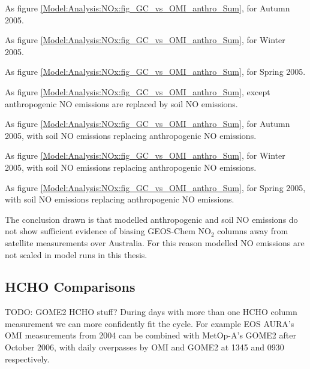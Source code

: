       {As figure \ref{Model:Analysis:NOx:fig_GC_vs_OMI_anthro_Sum}, for Autumn 2005.}
      {\label{Model:Analysis:NOx:fig_GC_vs_OMI_anthro_Aut}}
      
      {As figure \ref{Model:Analysis:NOx:fig_GC_vs_OMI_anthro_Sum}, for Winter 2005.}
      {\label{Model:Analysis:NOx:fig_GC_vs_OMI_anthro_Win}}
    
      {As figure \ref{Model:Analysis:NOx:fig_GC_vs_OMI_anthro_Sum}, for Spring 2005.}
      {\label{Model:Analysis:NOx:fig_GC_vs_OMI_anthro_Spr}}
    
      {As figure \ref{Model:Analysis:NOx:fig_GC_vs_OMI_anthro_Sum}, except anthropogenic NO emissions are replaced by soil NO emissions.}
      {\label{Model:Analysis:NOx:fig_GC_vs_OMI_soil_Sum}}
    
      {As figure \ref{Model:Analysis:NOx:fig_GC_vs_OMI_anthro_Sum}, for Autumn 2005, with soil NO emissions replacing anthropogenic NO emissions.}
      {\label{Model:Analysis:NOx:fig_GC_vs_OMI_soil_Aut}}
      
      {As figure \ref{Model:Analysis:NOx:fig_GC_vs_OMI_anthro_Sum}, for Winter 2005, with soil NO emissions replacing anthropogenic NO emissions.}
      {\label{Model:Analysis:NOx:fig_GC_vs_OMI_soil_Win}}
      
      {As figure \ref{Model:Analysis:NOx:fig_GC_vs_OMI_anthro_Sum}, for Spring 2005, with soil NO emissions replacing anthropogenic NO emissions.}
      {\label{Model:Analysis:NOx:fig_GC_vs_OMI_soil_Spr}}
    
    The conclusion drawn is that modelled anthropogenic and soil NO emissions do not show sufficient evidence of biasing GEOS-Chem NO$_2$ columns away from satellite measurements over Australia.
    For this reason modelled NO emissions are not scaled in model runs in this thesis.
    
  \subsection{HCHO Comparisons}
    TODO: GOME2 HCHO stuff?
    During days with more than one HCHO column measurement we can more confidently fit the cycle. 
    For example EOS AURA's OMI measurements from 2004 can be combined with MetOp-A's GOME2 after October 2006, with daily overpasses by OMI and GOME2 at 1345 and 0930 respectively.
    
